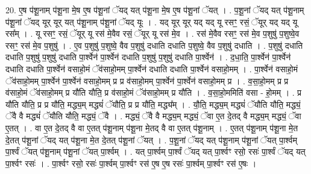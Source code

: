 \documentclass[17pt]{extarticle}
\begin{document}
20. ए॒ष प॑शू॒नाम् प॑शू॒ना मे॒ष ए॒ष प॑शू॒नां ॅयद् यत् प॑शू॒ना मे॒ष ए॒ष प॑शू॒नां ॅयत् । . प॒शू॒नां ॅयद् यत् प॑शू॒नाम् प॑शू॒नां ॅयद् यूर् यूर् यत् प॑शू॒नाम् प॑शू॒नां ॅयद् यूः । . यद् यूर् यूर् यद् यद् यू रसꣳ॒॒ रसं॒ ॅयूर् यद् यद् यू रस᳚म् । . यू रसꣳ॒॒ रसं॒ ॅयूर् यू रस॑ मे॒वैव रसं॒ ॅयूर् यू रस॑ मे॒व । . रस॑ मे॒वैव रसꣳ॒॒ रस॑ मे॒व प॒शुषु॑ प॒शुष्वे॒व रसꣳ॒॒ रस॑ मे॒व प॒शुषु॑ । . ए॒व प॒शुषु॑ प॒शुष्वे॒ वैव प॒शुषु॑ दधाति दधाति प॒शुष्वे॒ वैव प॒शुषु॑ दधाति । . प॒शुषु॑ दधाति दधाति प॒शुषु॑ प॒शुषु॑ दधाति पा॒र्श्वेन॑ पा॒र्श्वेन॑ दधाति प॒शुषु॑ प॒शुषु॑ दधाति पा॒र्श्वेन॑ । . द॒धा॒ति॒ पा॒र्श्वेन॑ पा॒र्श्वेन॑ दधाति दधाति पा॒र्श्वेन॑ वसाहो॒मं ॅव॑साहो॒मम् पा॒र्श्वेन॑ दधाति दधाति पा॒र्श्वेन॑ वसाहो॒मम् । . पा॒र्श्वेन॑ वसाहो॒मं ॅव॑साहो॒मम् पा॒र्श्वेन॑ पा॒र्श्वेन॑ वसाहो॒मम् प्र प्र व॑साहो॒मम् पा॒र्श्वेन॑ पा॒र्श्वेन॑ वसाहो॒मम् प्र । . व॒सा॒हो॒मम् प्र प्र व॑साहो॒मं ॅव॑साहो॒मम् प्र यौ॑ति यौति॒ प्र व॑साहो॒मं ॅव॑साहो॒मम् प्र यौ॑ति । . व॒सा॒हो॒ममिति॑ वसा - हो॒मम् । . प्र यौ॑ति यौति॒ प्र प्र यौ॑ति॒ मद्ध्य॒म् मद्ध्यं॑ ॅयौति॒ प्र प्र यौ॑ति॒ मद्ध्य᳚म् । . यौ॒ति॒ मद्ध्य॒म् मद्ध्यं॑ ॅयौति यौति॒ मद्ध्यं॒ ॅवै वै मद्ध्यं॑ ॅयौति यौति॒ मद्ध्यं॒ ॅवै । . मद्ध्यं॒ ॅवै वै मद्ध्य॒म् मद्ध्यं॒ ॅवा ए॒त दे॒तद् वै मद्ध्य॒म् मद्ध्यं॒ ॅवा ए॒तत् । . वा ए॒त दे॒तद् वै वा ए॒तत् प॑शू॒नाम् प॑शू॒ना मे॒तद् वै वा ए॒तत् प॑शू॒नाम् । . ए॒तत् प॑शू॒नाम् प॑शू॒ना मे॒त दे॒तत् प॑शू॒नां ॅयद् यत् प॑शू॒ना मे॒त दे॒तत् प॑शू॒नां ॅयत् । . प॒शू॒नां ॅयद् यत् प॑शू॒नाम् प॑शू॒नां ॅयत् पा॒र्श्वम् पा॒र्श्वं ॅयत् प॑शू॒नाम् प॑शू॒नां ॅयत् पा॒र्श्वम् । . यत् पा॒र्श्वम् पा॒र्श्वं ॅयद् यत् पा॒र्श्वꣳ रसो॒ रसः॑ पा॒र्श्वं ॅयद् यत् पा॒र्श्वꣳ रसः॑ । . पा॒र्श्वꣳ रसो॒ रसः॑ पा॒र्श्वम् पा॒र्श्वꣳ रस॑ ए॒ष ए॒ष रसः॑ पा॒र्श्वम् पा॒र्श्वꣳ रस॑ ए॒षः । \newline
\end{document}
